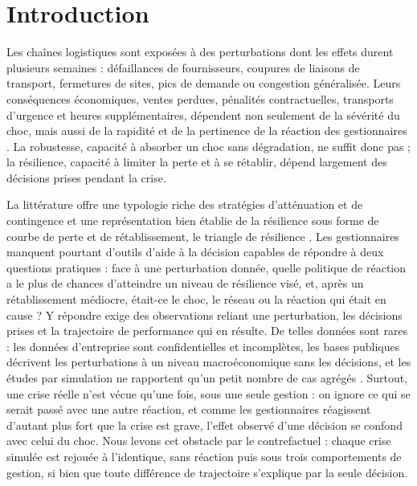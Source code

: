 
\section{Introduction}
\label{sec:1}

Les chaînes logistiques sont exposées à des perturbations dont les effets durent plusieurs semaines : défaillances de fournisseurs, coupures de liaisons de transport, fermetures de sites, pics de demande ou congestion généralisée. Leurs conséquences économiques, ventes perdues, pénalités contractuelles, transports d'urgence et heures supplémentaires, dépendent non seulement de la sévérité du choc, mais aussi de la rapidité et de la pertinence de la réaction des gestionnaires \citep{sheffi2005book,ivanov2019ijpr}. La robustesse, capacité à absorber un choc sans dégradation, ne suffit donc pas ; la résilience, capacité à limiter la perte et à se rétablir, dépend largement des décisions prises pendant la crise.

La littérature offre une typologie riche des stratégies d'atténuation et de contingence \citep{tomlin2006,chopra2004} et une représentation bien établie de la résilience sous forme de courbe de perte et de rétablissement, le triangle de résilience \citep{bruneau2003}. Les gestionnaires manquent pourtant d'outils d'aide à la décision capables de répondre à deux questions pratiques : face à une perturbation donnée, quelle politique de réaction a le plus de chances d'atteindre un niveau de résilience visé, et, après un rétablissement médiocre, était-ce le choc, le réseau ou la réaction qui était en cause ? Y répondre exige des observations reliant une perturbation, les décisions prises et la trajectoire de performance qui en résulte. De telles données sont rares : les données d'entreprise sont confidentielles et incomplètes, les bases publiques décrivent les perturbations à un niveau macroéconomique sans les décisions, et les études par simulation ne rapportent qu'un petit nombre de cas agrégés \citep{ramzy2022,do2024}. Surtout, une crise réelle n'est vécue qu'une fois, sous une seule gestion : on ignore ce qui se serait passé avec une autre réaction, et comme les gestionnaires réagissent d'autant plus fort que la crise est grave, l'effet observé d'une décision se confond avec celui du choc. Nous levons cet obstacle par le contrefactuel : chaque crise simulée est rejouée à l'identique, sans réaction puis sous trois comportements de gestion, si bien que toute différence de trajectoire s'explique par la seule décision.

